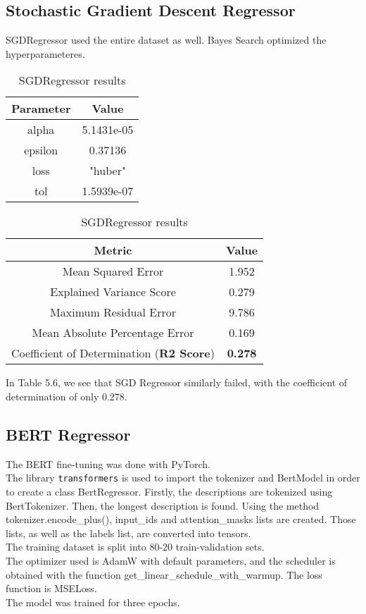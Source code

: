 \documentclass[times, utf8, zavrsni, english]{fer}
\begin{document}
\subsection{Stochastic Gradient Descent Regressor}
SGDRegressor used the entire dataset as well. Bayes Search optimized the hyperparameteres.
\begin{table}[h!]
	\parbox{.45\linewidth}{
		\centering
		\begin{tabular}{|| c | c ||} 
			\hline
			Parameter & Value \\ [0.5ex] 
			\hline\hline
			alpha & 5.1431e-05  \\ \hline
			epsilon & 0.37136 \\ \hline
			loss & "huber" \\ \hline
			tol & 1.5939e-07  \\ 
			\hline
		\end{tabular}
		\caption{Hyperparameteres for SGDRegressor}
		\label{table:7}
	}
	\parbox{.45\linewidth}{
		\centering
		\begin{tabular}{|| c | c ||} 
			\hline
			Metric & Value \\ [0.5ex] 
			\hline\hline
			Mean Squared Error & 1.952  \\ \hline
			Explained Variance Score & 0.279\\ \hline
			Maximum Residual Error & 9.786 \\ \hline
			Mean Absolute Percentage Error & 0.169 \\ \hline
			Coefficient of Determination (\textbf{R2 Score}) & \textbf{0.278} \\
			\hline
		\end{tabular}
		\caption{SGDRegressor results}
		\label{table:8}
	}
\end{table}

In Table 5.6, we see that SGD Regressor similarly failed, with the coefficient of determination of only 0.278.

\subsection{BERT Regressor}
The BERT fine-tuning was done with PyTorch.\\
The library \texttt{transformers} is used to import the tokenizer and BertModel in order to create a class BertRegressor.
Firstly, the descriptions are tokenized using BertTokenizer. Then, the longest description is found. Using the method tokenizer.encode\_plus(), input\_ids and attention\_masks lists are created. Those lists, as well as the labels list, are converted into tensors. \\
The training dataset is split into 80-20 train-validation sets. \\
The optimizer used is AdamW with default parameters, and the scheduler is obtained with the function get\_linear\_schedule\_with\_warmup. 
The loss function is MSELoss.\\
The model was trained for three epochs. 
\end{document}
